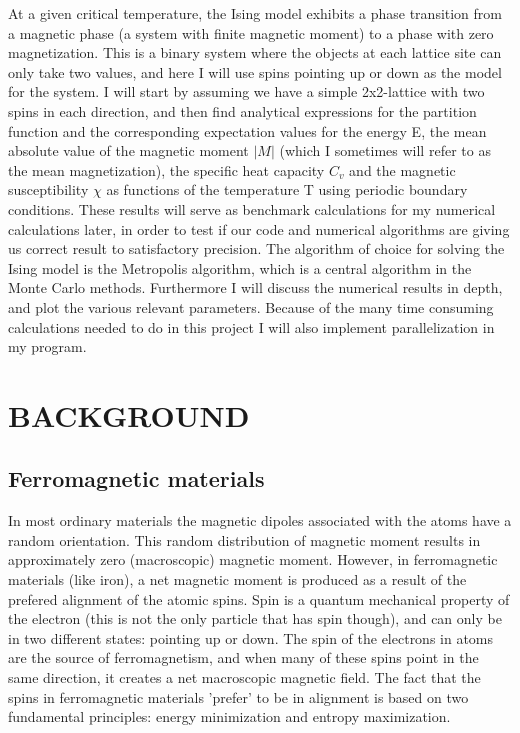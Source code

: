 \documentclass[twocolumn]{article}
\begin{document}
At a given critical temperature, the Ising model exhibits a phase transition from a magnetic phase (a system with finite magnetic moment) to a phase with zero magnetization. This is a binary system where the objects at each lattice site can only take two values, and here I will use spins pointing up or down as the model for the system.\newline
I will start by assuming we have a simple 2x2-lattice with two spins in each direction, and then find analytical expressions for the partition function and the corresponding expectation values for the energy E, the mean absolute value of the magnetic moment $|M|$ (which I sometimes will refer to as the mean magnetization), the specific heat capacity $C_v$ and the magnetic susceptibility $\chi$ as functions of the temperature T using periodic boundary conditions. These results will serve as benchmark calculations for my numerical calculations later, in order to test if our code and numerical algorithms are giving us correct result to satisfactory precision. The algorithm of choice for solving the Ising model is the Metropolis algorithm, which is a central algorithm in the Monte Carlo methods.\newline
Furthermore I will discuss the numerical results in depth, and plot the various relevant parameters.
Because of the many time consuming calculations needed to do in this project I will also implement parallelization in my program.

\section{BACKGROUND}
\subsection{Ferromagnetic materials}
In most ordinary materials the magnetic dipoles associated with the atoms have a random orientation. This random distribution of magnetic moment results in approximately zero (macroscopic) magnetic moment. However, in ferromagnetic materials (like iron), a net magnetic moment is produced as a result of the prefered alignment of the atomic spins.
Spin is a quantum mechanical property of the electron (this is not the only particle that has spin though), and can only be in two different states: pointing up or down. The spin of the electrons in atoms are the source of ferromagnetism, and when many of these spins point in the same direction, it creates a net macroscopic magnetic field.
The fact that the spins in ferromagnetic materials 'prefer' to be in alignment is based on two fundamental principles: energy minimization and entropy maximization.
\end{document}
